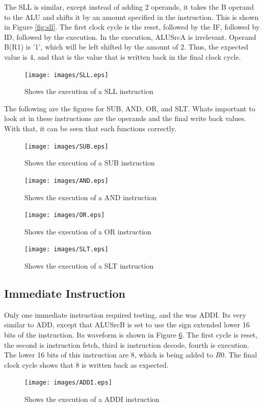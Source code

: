 \documentclass[12pt, a4paper]{article}
\begin{document}
The SLL is similar, except instead of adding 2 operands, it takes the B operand to the ALU
and shifts it by an amount specified in the instruction. This is shown in Figure \ref{fig:sll}.
The first clock cycle is the reset, followed by the IF, followed by ID, followed by the execution.
In the execution, ALUSrcA is irrelevant. Operand B(R1) is '1', which will be left shifted by the amount
of 2. Thus, the expected value is 4, and that is the value that is written back in the final clock cycle.

\begin{figure}[h]
  \centering
  \texttt{[image: images/SLL.eps]}
  \caption{Shows the execution of a SLL instruction}
  \label{fig:ssl}
\end{figure}

The following are the figures for SUB, AND, OR, and SLT. Whats important to look at in these instructions
are the operands and the final write back values. With that, it can be seen that each functions correctly.

\begin{figure}[h]
  \centering
  \texttt{[image: images/SUB.eps]}
  \caption{Shows the execution of a SUB instruction}
  \label{fig:sub}
\end{figure}

\begin{figure}[h]
  \centering
  \texttt{[image: images/AND.eps]}
  \caption{Shows the execution of a AND instruction}
  \label{fig:and}
\end{figure}

\begin{figure}[h]
  \centering
  \texttt{[image: images/OR.eps]}
  \caption{Shows the execution of a OR instruction}
  \label{fig:or}
\end{figure}

\begin{figure}[h]
  \centering
  \texttt{[image: images/SLT.eps]}
  \caption{Shows the execution of a SLT instruction}
  \label{fig:or}
\end{figure}

\subsection{Immediate Instruction}
Only one immediate instruction required testing, and the was ADDI. Its very similar to ADD, except
that ALUSrcB is set to use the sign extended lower 16 bits of the instruction. Its waveform is shown
in Figure \ref{fig:addi}. The first cycle is reset, the second is instruction fetch, third is instruction
decode, fourth is execution. The lower 16 bits of this instruction are 8, which is being added to
$R0$. The final clock cycle shows that 8 is written back as expected.
\begin{figure}[h]
  \centering
  \texttt{[image: images/ADDI.eps]}
  \caption{Shows the execution of a ADDI instruction}
  \label{fig:addi}
\end{figure}
\end{document}

